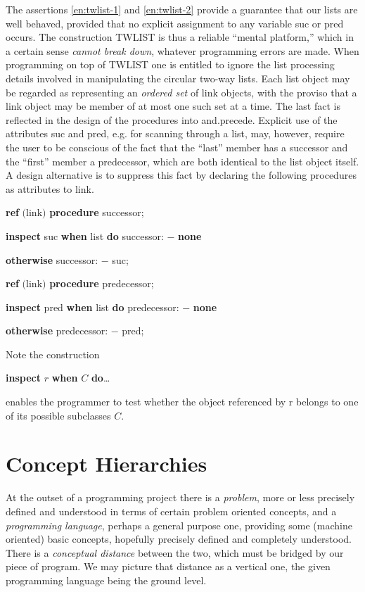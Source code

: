 \documentclass[twoside,11pt]{book}
\begin{document}
The assertions \ref{en:twlist-1} and \ref{en:twlist-2} provide a guarantee that our lists are well behaved, provided that no explicit assignment to any variable suc or pred occurs. The construction TWLIST is thus a reliable ``mental platform,'' which in a certain sense \textit{cannot break down}, whatever programming errors are made. When programming on top of TWLIST one is entitled to ignore the list processing details involved in manipulating the circular two-way lists. Each list object may be regarded as representing an \textit{ordered set} of link objects, with the proviso that a link object may be member of at most one such set at a time. The last fact is reflected in the design of the procedures into and.precede. Explicit use of the attributes suc and pred, e.g. for scanning through a list, may, however, require the user to be conscious of the fact that the ``last'' member has a successor and the ``first'' member a predecessor, which are both identical to the list object itself. A design alternative is to suppress this fact by declaring the following procedures as attributes to link.

\quad \textbf{ref} $($link$)$ \textbf{procedure} successor;

\quad \quad \textbf{inspect} suc \textbf{when} list \textbf{do} successor: $-$ \textbf{none}

\quad \quad \textbf{otherwise} successor: $-$ suc;

\quad \textbf{ref} $($link$)$ \textbf{procedure} predecessor;

\quad \quad \textbf{inspect} pred \textbf{when} list \textbf{do} predecessor: $-$ \textbf{none}

\quad \quad \textbf{otherwise} predecessor: $-$ pred;

Note the construction

\quad \textbf{inspect} $r$ \textbf{when} $C$ \textbf{do}\dots

\noindent
enables the programmer to test whether the object referenced by r belongs to one of its possible subclasses $C$.

\section{Concept Hierarchies}

At the outset of a programming project there is a \textit{problem}, more or less precisely defined and understood in terms of certain problem oriented concepts, and a \textit{programming language}, perhaps a general purpose one, providing some (machine oriented) basic concepts, hopefully precisely defined and completely understood. There is a \textit{conceptual distance} between the two, which must be bridged by our piece of program. We may picture that distance as a vertical one, the given programming language being the ground level.
\end{document}
